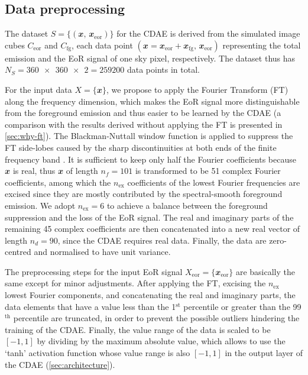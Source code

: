 \documentclass[fleqn,usenatbib]{mnras}
\newcommand{\R}[1]{\mathrm{#1}}
\newcommand{\B}[1]{\mathbfit{#1}}
\newcommand{\editwip}[1]{{\leavevmode\color{magenta}#1}}
\begin{document}
\subsection{Data preprocessing}
\label{sec:preprocessing}

The dataset $S = \{(\B{x}, \,\B{x}_{\R{eor}})\}$ for the CDAE is derived
from the simulated image cubes $C_{\R{eor}}$ and $C_{\R{fg}}$, each data
point $(\B{x} = \B{x}_{\R{eor}} + \B{x}_{\R{fg}}, \,\B{x}_{\R{eor}})$
representing the total emission and the EoR signal of one sky pixel,
respectively.
\editwip{%
The dataset thus has $N_S = \num{360x360 x 2} = \num{259200}$
data points in total.}

For the input data $X = \{\B{x}\}$, we propose to apply the
Fourier Transform (FT) along the frequency dimension,
which makes the EoR signal more distinguishable from the
foreground emission and thus easier to be learned by the CDAE
(a comparison with the results derived without applying the FT is
presented in \autoref{sec:why-ft}).
The Blackman-Nuttall window function is applied to suppress the
FT side-lobes caused by the sharp discontinuities at both ends
of the finite frequency band \citep[e.g.,][]{chapman2016}.
It is sufficient to keep only half the Fourier coefficients because
$\B{x}$ is real, thus $\B{x}$ of length $n_f = 101$ is transformed to
be 51 complex Fourier coefficients, among which the $n_{\R{ex}}$
coefficients of the lowest Fourier frequencies are excised since they
are mostly contributed by the spectral-smooth foreground emission.
We adopt $n_{\R{ex}} = 6$ to achieve a balance between the foreground
suppression and the loss of the EoR signal.
The real and imaginary parts of the remaining 45 complex coefficients
are then concatenated into a new real vector of length $n_d = 90$,
since the CDAE requires real data.
Finally, the data are zero-centred and normalised to have unit variance.

The preprocessing steps for the input EoR signal
$X_{\R{eor}} = \{\B{x}_{\R{eor}}\}$
are basically the same except for minor adjustments.
After applying the FT, excising the $n_{\R{ex}}$ lowest Fourier
components, and concatenating the real and imaginary parts,
the data elements that have a value less than the 1$^{\R{st}}$
percentile or greater than the 99$^{\R{th}}$ percentile are truncated,
in order to prevent the possible outliers hindering the training of
the CDAE.
Finally, the value range of the data is scaled to be $[-1, 1]$ by
dividing by the maximum absolute value,
which allows to use the `tanh' activation function whose value range
is also $[-1, 1]$ in the output layer of the CDAE
(\autoref{sec:architecture}).
\end{document}
